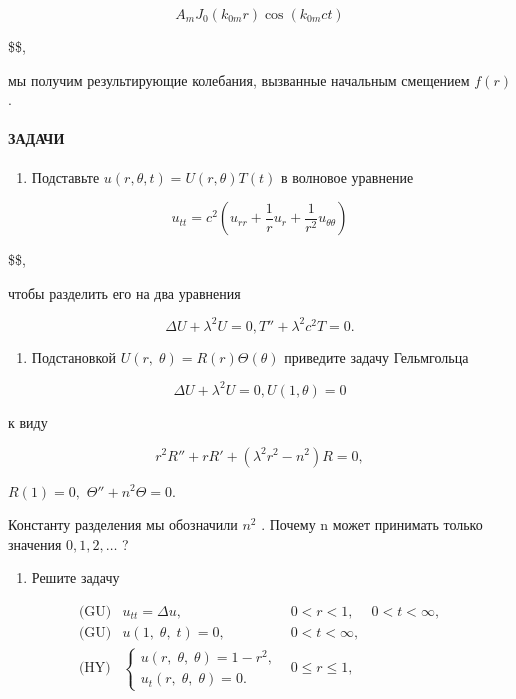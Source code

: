 \documentclass[
  ukrainian,
]{article}
\providecommand{\tightlist}{%
  \setlength{\itemsep}{0pt}\setlength{\parskip}{0pt}}
\begin{document}
\[
A_m J_0(k_{0m}r)\cos(k_{0m}ct)
\]

\$\$,

мы получим результирующие колебания, вызванные начальным смещением
\(f(r)\).

\paragraph{ЗАДАЧИ}\label{ux437ux430ux434ux430ux447ux438-6}

\begin{enumerate}
\def\labelenumi{\arabic{enumi}.}
\tightlist
\item
  Подставьте \(u(r, \theta, t) = U(r, \theta) T(t)\) в волновое
  уравнение
\end{enumerate}

\[
u_{tt} = c^2 \left( u_{rr} + \frac{1}{r} u_r + \frac{1}{r^2} u_{\theta\theta} \right)
\]

\$\$,

чтобы разделить его на два уравнения

\[
\Delta U + \lambda^2 U = 0,
T'' + \lambda^2 c^2 T = 0.
\]

\begin{enumerate}
\def\labelenumi{\arabic{enumi}.}
\setcounter{enumi}{1}
\tightlist
\item
  Подстановкой
  \(U\left(r,\;\theta\right)=R\left(r\right)\Theta\left(\theta\right)\)
  приведите задачу Гельмгольца
\end{enumerate}

\[
\Delta U + \lambda^2 U = 0,
U(1, \theta) = 0
\]

к виду

\[
r^2R'' + rR' + (\lambda^2r^2 - n^2)R = 0,
\]

\(R(1) = 0,\) \(\Theta'' + n^2\Theta = 0.\)

Константу разделения мы обозначили \(n^2\) . Почему n может принимать
только значения \(0, 1, 2, \ldots\) ?

\begin{enumerate}
\def\labelenumi{\arabic{enumi}.}
\setcounter{enumi}{2}
\tightlist
\item
  Решите задачу
\end{enumerate}

\[
\begin{array}{lll} \text{(GU)} & u_{tt} = \Delta u, & 0 < r < 1, & 0 < t < \infty, \\ \text{(GU)} & u\left(1, \; \theta, \; t\right) = 0, & 0 < t < \infty, \\ \text{(HY)} & \begin{cases} u\left(r, \; \theta, \; \theta\right) = 1 - r^2, \\ u_t\left(r, \; \theta, \; \theta\right) = 0. \end{cases} & 0 \leqslant r \leqslant 1, \\ \end{array}
\]
\end{document}
